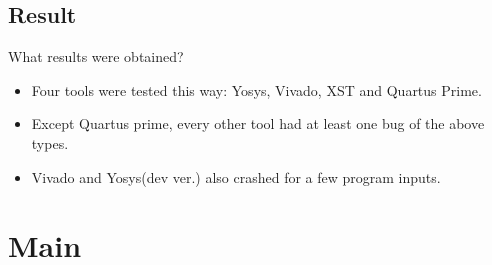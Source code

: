 \documentclass[notes, xcolor=dvipsnames]{beamer}
\begin{document}
    \subsection{Result}
    \begin{frame}{What results were obtained?}

        \begin{itemize}
            \item Four tools were tested this way: Yosys, Vivado, XST and Quartus Prime. 
            \item Except Quartus prime, every other tool had at least one bug of the above types. 
            \item Vivado and Yosys(dev ver.) also crashed for a few program inputs.
        \end{itemize}
        
    \end{frame}

    \section{Main}
    
\end{document}
